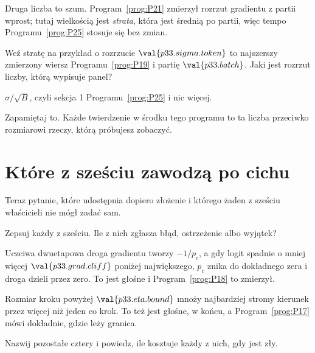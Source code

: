 \begin{fr}
Druga liczba to szum. Program~\ref{prog:P21} zmierzył rozrzut gradientu z
partii wprost; tutaj wielkością jest \emph{strata}, która jest średnią po
partii, więc tempo Programu~\ref{prog:P25} stosuje się bez zmian.

Weź stratę na przykład o rozrzucie $\val{p33.sigma.token}$ \dash{} to
najszerszy zmierzony wiersz Programu~\ref{prog:P19} \dash{} i partię
$\val{p33.batch}$. Jaki jest rozrzut liczby, którą wypisuje panel?
\dotline
\nextframe
\end{fr}

\begin{fr}
$\sigma/\sqrt{B}$, czyli sekcja 1 Programu~\ref{prog:P25} i nic więcej.

Zapamiętaj to. Każde twierdzenie w środku tego programu to ta liczba
przeciwko rozmiarowi rzeczy, którą próbujesz zobaczyć.
\end{fr}

\section{Które z sześciu zawodzą po cichu}
\label{sec:P33-silent}

\begin{fr}
Teraz pytanie, które udostępnia dopiero złożenie i którego żaden z sześciu
właścicieli nie mógł zadać sam.

Zepsuj każdy z sześciu. Ile z nich zgłasza błąd, ostrzeżenie albo wyjątek?
\dotline
\nextframe
\end{fr}

\begin{fr}
\begin{ansblock}
Uczciwa dwuetapowa droga gradientu tworzy $-1/p_c$, a gdy logit spadnie o
mniej więcej $\val{p33.grad.cliff}$ poniżej największego, $p_c$ znika do
dokładnego zera i droga dzieli przez zero. To jest głośne i
Program~\ref{prog:P18} to zmierzył.

Rozmiar kroku powyżej $\val{p33.eta.bound}$ mnoży najbardziej stromy kierunek
przez więcej niż jeden co krok. To też jest głośne, w końcu, a
Program~\ref{prog:P17} mówi dokładnie, gdzie leży granica.
\end{ansblock}

Nazwij pozostałe cztery i powiedz, ile kosztuje każdy z nich, gdy jest zły.
\dotline
\nextframe
\end{fr}

